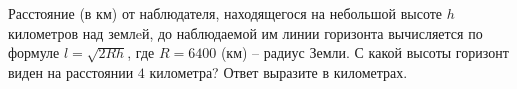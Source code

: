 \begin{ex}
	\begin{condition}
		Расстояние (в км) от наблюдателя, находящегося на небольшой высоте \( h \) километров над землeй, до наблюдаемой им линии горизонта вычисляется по формуле \( l=\sqrt{2Rh} \), где \( R = 6400 \) (км) -- радиус Земли. С какой высоты горизонт виден на расстоянии \(4\) километра? Ответ выразите в километрах.
	\end{condition}
\end{ex}